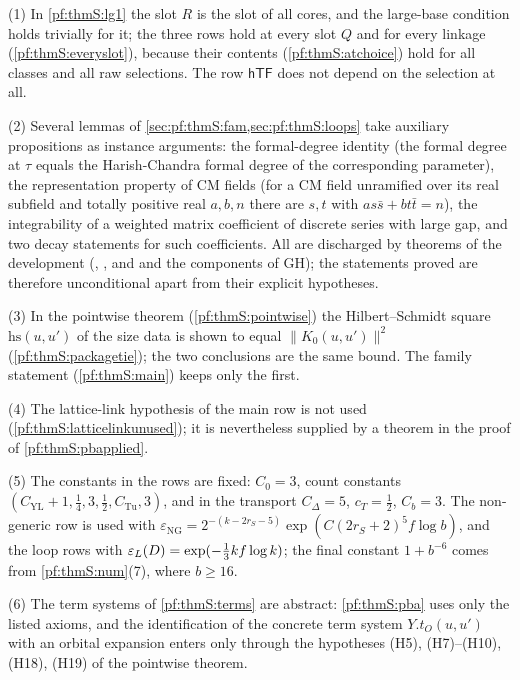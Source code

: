 \begin{remark}\label{pf:thmS:rem1}
(1) In \cref{pf:thmS:lg1} the slot $R$ is the slot of all cores, and the large-base condition holds trivially for it; the
three rows hold at every slot $Q$ and for every linkage (\cref{pf:thmS:everyslot}), because their contents
(\cref{pf:thmS:atchoice}) hold for all classes and all raw selections. The row $\mathsf{hTF}$ does not depend on the
selection at all.

(2) Several lemmas of \cref{sec:pf:thmS:fam,sec:pf:thmS:loops} take auxiliary propositions as instance arguments: the formal-degree identity (the formal degree at $\tau$ equals the Harish-Chandra formal degree of the corresponding parameter), the representation property of CM fields (for a CM field unramified over its real subfield and totally positive
real $a,b,n$ there are $s,t$ with $as\bar s+bt\bar t=n$), the integrability of a weighted matrix coefficient of discrete series with large gap, and two decay statements for such coefficients. All are discharged by theorems of
the development (, , and 
and the components of $\mathrm{GH}$); the statements proved are therefore unconditional apart from their explicit
hypotheses.

(3) In the pointwise theorem (\cref{pf:thmS:pointwise}) the Hilbert--Schmidt square $\mathrm{hs}(u,u')$ of the size data is
shown to equal $\|K_0(u,u')\|^2$ (\cref{pf:thmS:packagetie}); the two conclusions are the same bound. The family statement
(\cref{pf:thmS:main}) keeps only the first.

(4) The lattice-link hypothesis of the main row is not used (\cref{pf:thmS:latticelinkunused}); it is nevertheless
supplied by a theorem in the proof of \cref{pf:thmS:pbapplied}.

(5) The constants in the rows are fixed: $C_0=3$, count constants $(C_{\mathrm{YL}}+1,\frac14,3,\frac12,C_{\mathrm{Tu}},3)$, and
in the transport $C_\Delta=5$, $c_T=\frac12$, $C_b=3$. The non-generic row is used with $\varepsilon_{\mathrm{NG}}=
2^{-(k-2r_S-5)}\exp(C(2r_S+2)^5f\log b)$, and the loop rows with $\varepsilon_{L}(D)=\exp(-\frac13kf\log k)$; the final constant
$1+b^{-6}$ comes from \cref{pf:thmS:num}(7), where $b\ge16$.

(6) The term systems of \cref{pf:thmS:terms} are abstract: \cref{pf:thmS:pba} uses only the listed axioms, and the
identification of the concrete term system $Y.t_O(u,u')$ with an orbital expansion enters only through the hypotheses
(H5), (H7)--(H10), (H18), (H19) of the pointwise theorem.
\end{remark}
